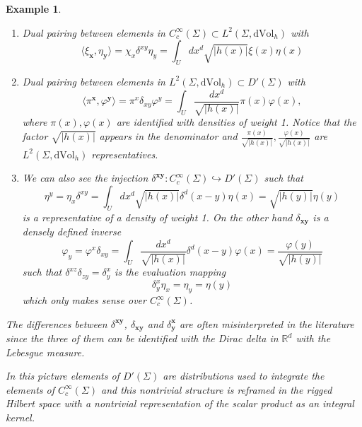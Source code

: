 \documentclass{elsarticle}%
\newtheorem{example}{Example}%
\begin{document}
\begin{example}
\begin{enumerate}[label=\alph*)]
        \item Dual pairing between elements in $C^\infty_c(\Sigma)\subset L^2(\Sigma,\mathrm{dVol}_h)$ with $$\langle \xi_{\mathbf{x}} ,\eta_{\mathbf{y}}\rangle =\chi_x\delta^{xy}\eta_y=\int_U dx^d\sqrt{\lvert h(x)\rvert} \xi(x)\eta(x)$$
    \item Dual pairing between elements in  $L^2(\Sigma,\mathrm{dVol}_h) \subset D'(\Sigma)$ with $$\langle\pi^{\mathbf{x}} ,\varphi^{\mathbf{y}}\rangle =\pi^x\delta_{xy}\varphi^y=\int_U\frac{dx^d}{\sqrt{\lvert h(x)\rvert}} \pi(x)\varphi(x),$$
        where $\pi(x),\varphi(x)$ are identified with  densities of weight 1. Notice that the factor $\sqrt{\lvert h(x)\rvert}$ appears in the denominator and $\frac{\pi(x)}{\sqrt{\lvert h(x)\rvert}}, \frac{\varphi(x)}{\sqrt{\lvert h(x)\rvert}}$ are $L^2(\Sigma, \mathrm{dVol}_h)$ representatives.
    \item We can also see the injection ${\delta^{\mathbf{xy}}}:C^\infty_c(\Sigma) \hookrightarrow D'(\Sigma)$  such that
    $$\eta^y=\eta_x\delta^{xy}=\int_U dx^d\sqrt{\lvert h(x)\rvert}\delta^d(x-y) \eta(x)=\sqrt{\lvert h(y)\rvert}\eta(y)$$
    is a representative of a density of weight 1. On the other hand $\delta_{\mathbf{xy}}$ is a densely defined inverse 
    $$\varphi_y=\varphi^x\delta_{xy}=\int_U \frac{dx^d}{\sqrt{\lvert h(x)\rvert}}\delta^d(x-y) \varphi(x)=\frac{\varphi(y)}{\sqrt{\lvert h(y)\rvert}}$$
    such that $\delta^{xz}\delta_{zy}=\delta^x_y$ is the evaluation mapping
    $$\delta^x_y\eta_x=\eta_y=\eta(y)$$
    which only makes sense over $C^\infty_c(\Sigma)$.
\end{enumerate}

The differences between $\delta^{\mathbf{xy}}$, $\delta_{\mathbf{xy}}$ and $\delta^{\mathbf{x}}_{\mathbf{y}}$ are often misinterpreted in the literature since the three of them can be identified with the Dirac delta in $\mathbb{R}^d$ with the Lebesgue measure. 

In this picture elements of  $D'(\Sigma)$ are distributions used to integrate the elements of $C^\infty_c(\Sigma)$ and this nontrivial structure is reframed in the rigged Hilbert space with a nontrivial representation of the scalar product as an integral kernel.


\end{example}
\end{document}
